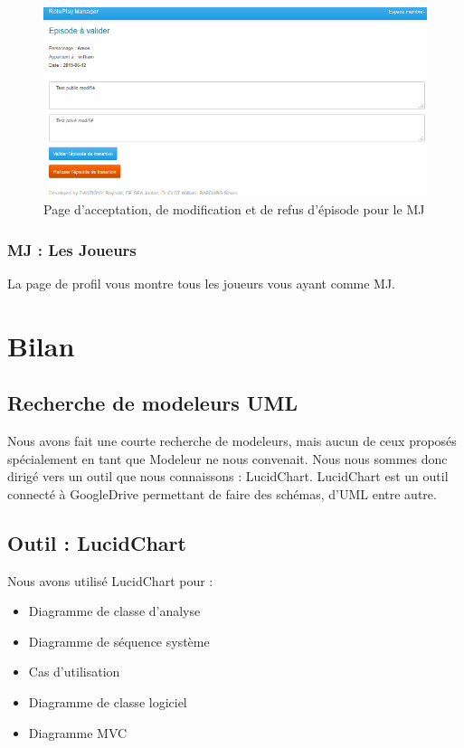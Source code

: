 \documentclass[a4paper,oneside,10pt]{article}
\begin{document}
\begin{figure}[H]
	\begin{center}
		\includegraphics[width=\textwidth]{images/manuel/validationepisodemj.png}  
		\caption{Page d'acceptation, de modification et de refus d'épisode pour le MJ}
	\end{center}
\end{figure}


\subsubsection{MJ : Les Joueurs}
\label{MUMJLesJoueurs}

La page de profil vous montre tous les joueurs vous ayant comme MJ.


\pagebreak

\section{Bilan}

\subsection{Recherche de modeleurs UML}

Nous avons fait une courte recherche de modeleurs, mais aucun de ceux proposés spécialement en tant que Modeleur ne nous convenait. Nous nous sommes donc dirigé vers un outil que nous connaissons : LucidChart. LucidChart est un outil connecté à GoogleDrive permettant de faire des schémas, d'UML entre autre. 


\subsection{Outil : LucidChart}

Nous avons utilisé LucidChart pour : 
\begin{itemize}
	\item Diagramme de classe d'analyse
	\item Diagramme de séquence système
	\item Cas d'utilisation
	\item Diagramme de classe logiciel
	\item Diagramme MVC
\end{itemize}
\end{document}
